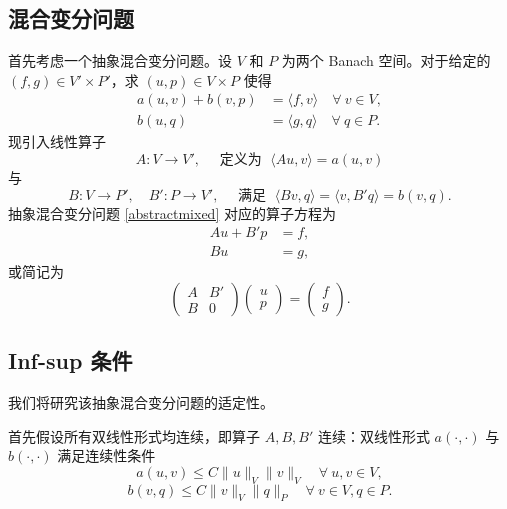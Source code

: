 \subsection{混合变分问题}
首先考虑一个抽象混合变分问题。设 $V$ 和 $P$ 为两个 Banach 空间。对于给定的 $(f, g)\in V'\times P'$，求 $(u, p)\in V \times P$ 使得
\begin{subequations}\label{abstractmixed}
\begin{align}
a(u, v)+ b(v, p) & =\langle f, v\rangle \quad \forall~v\in V, \label{abstractmixed1}\\
b(u, q) & =\langle g, q\rangle  \quad \forall~q\in P.\label{abstractmixed2}
\end{align}
\end{subequations}
现引入线性算子
\[
A : V \to V',\quad \textrm{ 定义为 }\; \langle Au, v\rangle = a(u, v)
\]
与
\[
B: V\to P', \quad B' : P \to V',\quad \textrm{ 满足 }\; \langle Bv, q\rangle = \langle v, B'q\rangle = b(v, q).
\]
抽象混合变分问题 \eqref{abstractmixed} 对应的算子方程为
\begin{align}
Au+ B'p & =f, \label{abstractmixedoperator1}\\
Bu & =g, \label{abstractmixedoperator2}
\end{align}
或简记为
\begin{equation*}%
\begin{pmatrix}
A &  B' \\
B & 0
\end{pmatrix}
\begin{pmatrix}
u \\ p
\end{pmatrix}
=
\begin{pmatrix}
f \\ g
\end{pmatrix}.
\end{equation*}


\subsection{Inf-sup 条件}

我们将研究该抽象混合变分问题的适定性。

首先假设所有双线性形式均连续，即算子 $A, B, B'$ 连续：双线性形式 $a(\cdot, \cdot)$ 与 $b(\cdot, \cdot)$ 满足连续性条件
\begin{equation}\label{acontinuous}
a(u, v)\leq C\|u\|_V\|v\|_V \quad \forall~ u, v\in V,
\end{equation}
\begin{equation}\label{bcontinuous}
b(v, q)\leq C\|v\|_V\|q\|_P \quad \forall~ v\in V, q\in P.
\end{equation}

